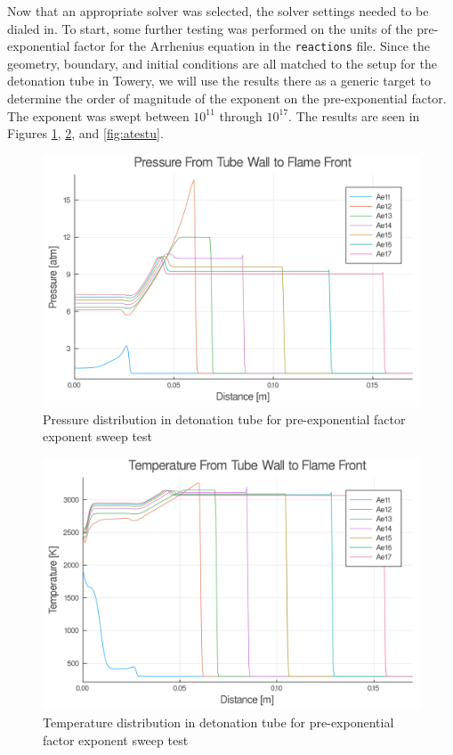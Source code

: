 Now that an appropriate solver was selected, the solver settings needed to be dialed in. To start, some further testing was performed on the units of the pre-exponential factor for the Arrhenius equation in the \verb|reactions| file. Since the geometry, boundary, and initial conditions are all matched to the setup for the detonation tube in Towery\cite{towery1}, we will use the results there as a generic target to determine the order of magnitude of the exponent on the pre-exponential factor. The exponent was swept between \(10^{11}\) through \(10^{17}\). The results are seen in Figures \ref{fig:atestp}, \ref{fig:atestt}, and \ref{fig:atestu}. 

\begin{figure}
\centering
\includegraphics[width=0.85\linewidth]{./figs/Atest/p.png}
\caption{Pressure distribution in detonation tube for pre-exponential factor exponent sweep test}
\label{fig:atestp}
\end{figure}

\begin{figure}
\centering
\includegraphics[width=0.85\linewidth]{./figs/Atest/t.png}
\caption{Temperature distribution in detonation tube for pre-exponential factor exponent sweep test}
\label{fig:atestt}
\end{figure}

